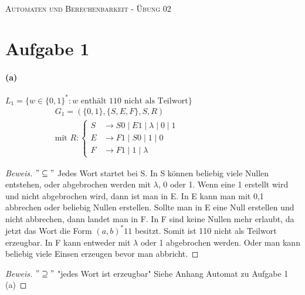 \documentclass[titlepage]{article}
\renewcommand{\]}{\right]}
\renewcommand{\[}{\left[}
\renewcommand{\)}{\right)}
\renewcommand{\(}{\left(}
\renewcommand{\|}{\;|\;}
\begin{document}
	
	\begin{center}
		\hrulefill\\
		\begin{center}
			\LARGE\textsc{Automaten und Berechenbarkeit - Übung 02} \normalsize\\
		\end{center}
		\hrulefill
		\date{\today}
	\end{center}


	\section*{Aufgabe 1}
		\paragraph{(a)} $L_1=\{w\in\{0,1\}^*:w\text{ enthält 110 nicht als Teilwort}\}$
		\begin{align*}
			G_1=(\{0,1\},\{S,E,F\},S,R)&&&&&&&&&&&\\
			\text{mit }R:
			\begin{cases}
				S&\rightarrow S0\|E1\|\lambda\|0\|1\\
				E&\rightarrow F1\|S0\|1\|0\\
				F&\rightarrow F1\|1\|\lambda    
			\end{cases}
		\end{align*}
		\begin{proof}[Beweis] $"\subseteq"$
			Jedes Wort startet bei S.  In S können beliebig viele Nullen entstehen, oder abgebrochen werden mit $\lambda$, 0 oder 1. Wenn eine 1 erstellt wird und nicht abgebrochen wird, dann ist man in E. In E kann man mit 0,1 abbrechen oder beliebig Nullen erstellen. Sollte man in E eine Null erstellen und nicht abbrechen, dann landet man in F. In F sind keine Nullen mehr erlaubt, da jetzt das Wort die Form $(a,b)^*11$ besitzt. Somit ist 110 nicht als Teilwort erzeugbar. In F kann entweder mit $\lambda$ oder 1 abgebrochen werden. Oder man kann beliebig viele Einsen erzeugen bevor man abbricht.
		\end{proof}
		\begin{proof}[Beweis] $"\supseteq"$ "jedes Wort ist erzeugbar"
			Siehe Anhang Automat zu Aufgabe 1 (a)
		\end{proof}
		
\end{document}
